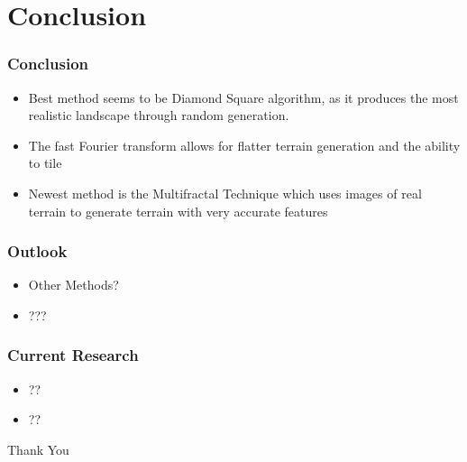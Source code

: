 \documentclass{beamer}
\begin{document}
\section{Conclusion}

\begin{frame}
 \frametitle{Conclusion}
\begin{itemize}
  \item Best method seems to be Diamond Square algorithm, as it produces the most realistic landscape through random generation.
  \item The fast Fourier transform allows for flatter terrain generation and the ability to tile
 \item Newest method is the Multifractal Technique which uses images of real terrain to generate terrain with very accurate features
  \end{itemize}
  \end{frame}
  
  \begin{frame}
  \frametitle{Outlook}
  \begin{itemize}
    \item Other Methods?
    \item ???
    \end{itemize}
\end{frame}

\begin{frame}
 \frametitle{Current Research}
\begin{itemize}
 \item ??
\item ??
\end{itemize}
\end{frame}




\begin{frame}
 Thank You
\end{frame}


\end{document}
